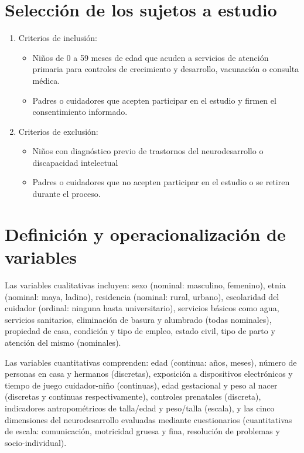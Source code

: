 \documentclass[11pt,letterpaper]{report}
\begin{document}
\section{Selección de los sujetos a estudio}
	\begin{enumerate}
		\item Criterios de inclusión:
			\begin{itemize}
				\item Niños de 0 a 59 meses de edad que acuden a servicios de
				atención primaria para controles de crecimiento y desarrollo,
				vacunación o consulta médica.
				\item Padres o cuidadores que acepten participar en el estudio
				y firmen el consentimiento informado.
			\end{itemize}
		\item Criterios de exclusión:
			\begin{itemize}
				\item Niños con diagnóstico previo de trastornos del
				neurodesarrollo o discapacidad intelectual
				\item Padres o cuidadores que no acepten participar en el
				estudio o se retiren durante el proceso.
			\end{itemize}
	\end{enumerate}

\section{Definición y operacionalización de variables}
Las variables cualitativas incluyen: sexo (nominal: masculino, femenino), etnia
(nominal: maya, ladino), residencia (nominal: rural, urbano), escolaridad del
cuidador (ordinal: ninguna hasta universitario), servicios básicos como agua,
servicios sanitarios, eliminación de basura y alumbrado (todas nominales),
propiedad de casa, condición y tipo de empleo, estado civil, tipo de parto y
atención del mismo (nominales).

Las variables cuantitativas comprenden: edad (continua: años, meses), número de
personas en casa y hermanos (discretas), exposición a dispositivos electrónicos
y tiempo de juego cuidador-niño (continuas), edad gestacional y peso al nacer
(discretas y continuas respectivamente), controles prenatales (discreta),
indicadores antropométricos de talla/edad y peso/talla (escala), y las cinco
dimensiones del neurodesarrollo evaluadas mediante cuestionarios (cuantitativas
de escala: comunicación, motricidad gruesa y fina, resolución de problemas y
socio-individual).
\end{document}
